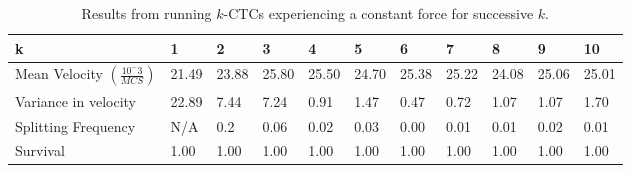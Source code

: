 \documentclass[12pt]{article}
\begin{document}
\begin{table}[h]
	\begin{tabular}{|l|l|l|l|l|l|l|l|l|l|l|}
	\hline
	k                                         & 1     & 2     & 3     & 4     & 5     & 6     & 7     & 8     & 9     & 10    \\ \hline
	Mean Velocity $(\frac{10^-3}{MCS})$ & 21.49 & 23.88 & 25.80 & 25.50 & 24.70 & 25.38 & 25.22 & 24.08 & 25.06 & 25.01 \\ \hline
	Variance in velocity 							& 22.89		&	7.44	&	7.24	&	0.91	&	1.47	&	0.47	&	0.72	&	1.07	&	1.07	&	1.70 \\ \hline
	Splitting Frequency              & N/A   & 0.2   & 0.06  & 0.02  & 0.03  & 0.00  & 0.01  & 0.01  & 0.02  & 0.01  \\ \hline
	Survival             & 1.00  & 1.00  & 1.00  & 1.00  & 1.00  & 1.00  & 1.00  & 1.00  & 1.00  & 1.00 \\ \hline
	\end{tabular}
	\caption{Results from running $k$-CTCs experiencing a constant force for successive $k$.}
	\label{racestats}
\end{table}
\end{document}
